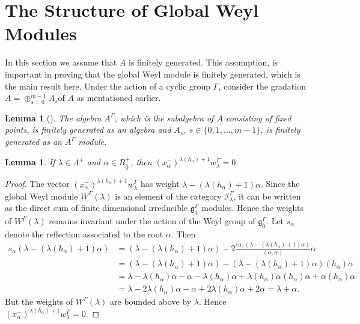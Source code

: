 \documentclass[11pt]{amsart}
\theoremstyle{plain}
\newtheorem{lemma}[thm]{Lemma}
\theoremstyle{definition}
\newcommand{\g}{\mathfrak{g}}
\begin{document}
\section{The Structure of Global Weyl Modules}\label{sec:7}
In this section we assume that $A$ is finitely generated. This assumption, is important in proving that the global Weyl module is finitely generated, which is the main result here. Under the action of a cyclic group $\Gamma$, consider the gradation $A=\oplus_{s=0}^{m-1}A_{s}$of $A$ as mentationed earlier. 
\begin{lemma}[\cite{Bourbaki85}]\label{lem:5}
The algebra $A^{\Gamma}$, which is the subalgebra of $A$ consisting of fixed points, is finitely generated as an algebra and $A_{s},~s\in\{0,1,\ldots,m-1\}$, is finitely generated as an $A^{\Gamma}$ module.
\end{lemma}
\begin{lemma}
If $\lambda\in \Lambda^+$ and $\alpha\in R^{+}_{\bar{0}}$, then $(x_{\alpha}^{-})^{\lambda(h_\alpha)+1}w_{\lambda}^{\Gamma}=0$.
\end{lemma}
\begin{proof}
The vector $(x_{\alpha}^{-})^{\lambda(h_{\alpha})+1}w_{\lambda}^{\Gamma}$ has weight $\lambda-(\lambda(h_{\alpha})+1)\alpha$. Since the global Weyl module $W^{\Gamma}(\lambda)$ is an element of the category $\mathcal{I}_{\lambda}^{\Gamma}$, it can be written as the direct sum of finite dimensional irreducible $\g^{\Gamma}_{\bar{0}}$ modules. Hence the weights of $W^{\Gamma}(\lambda)$ remains invariant under the action of the Weyl group of $\g_{\bar{0}}^{\Gamma}$. Let $s_{\alpha}$ denote the reflection associated to the root $\alpha$. Then
    \begin{align*}
        s_{\alpha}(\lambda-(\lambda(h_{\alpha})+1)\alpha)&=(\lambda-(\lambda(h_{\alpha})+1)\alpha)-2\frac{(\alpha,(\lambda-(\lambda(h_{\alpha})+1)\alpha)}{(\alpha,\alpha)}\alpha\\
        &=(\lambda-(\lambda(h_{\alpha})+1)\alpha)-(\lambda-(\lambda(h_{\alpha})+1)\alpha)(h_{\alpha})\alpha \\
        &=\lambda-\lambda(h_{\alpha})\alpha-\alpha-\lambda(h_{\alpha})\alpha+\lambda(h_{\alpha})\alpha(h_{\alpha})\alpha+\alpha(h_{\alpha})\alpha \\
            &=\lambda-2\lambda(h_{\alpha})\alpha-\alpha+2\lambda(h_{\alpha})\alpha+2\alpha=\lambda+\alpha.
        \end{align*}
But the weights of $W^{\Gamma}(\lambda)$ are bounded above by $\lambda$. Hence $(x_{\alpha}^{-})^{\lambda(h_\alpha)+1}w_{\lambda}^{\Gamma}=0$.
\end{proof}
\end{document}
